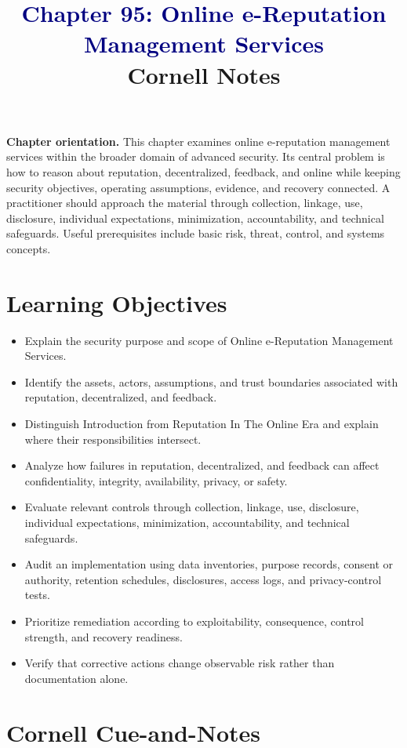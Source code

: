 \documentclass[11pt]{article}
\title{\textcolor{Navy}{Chapter 95: Online e-Reputation Management Services}\\[2mm]\large Cornell Notes}
\author{}
\date{}
\begin{document}
\maketitle
\thispagestyle{fancy}
\vspace{-1.5em}
\begin{orientationbox}
\textbf{Chapter orientation.} This chapter examines online e-reputation management services within the broader domain of advanced security. Its central problem is how to reason about reputation, decentralized, feedback, and online while keeping security objectives, operating assumptions, evidence, and recovery connected. A practitioner should approach the material through collection, linkage, use, disclosure, individual expectations, minimization, accountability, and technical safeguards. Useful prerequisites include basic risk, threat, control, and systems concepts.
\end{orientationbox}
\section*{Learning Objectives}
\begin{itemize}
\item Explain the security purpose and scope of Online e-Reputation Management Services.
\item Identify the assets, actors, assumptions, and trust boundaries associated with reputation, decentralized, and feedback.
\item Distinguish Introduction from Reputation In The Online Era and explain where their responsibilities intersect.
\item Analyze how failures in reputation, decentralized, and feedback can affect confidentiality, integrity, availability, privacy, or safety.
\item Evaluate relevant controls through collection, linkage, use, disclosure, individual expectations, minimization, accountability, and technical safeguards.
\item Audit an implementation using data inventories, purpose records, consent or authority, retention schedules, disclosures, access logs, and privacy-control tests.
\item Prioritize remediation according to exploitability, consequence, control strength, and recovery readiness.
\item Verify that corrective actions change observable risk rather than documentation alone.
\end{itemize}
\section*{Cornell Cue-and-Notes}
\end{document}
